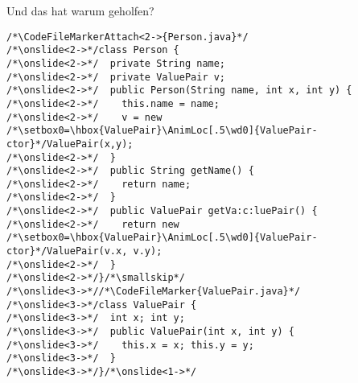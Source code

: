 {\iffull
\begin{frame}[fragile,t]{Und das hat warum geholfen?}
\begin{tikzpicture}[@O]
\end{tikzpicture}\vspace*{-\baselineskip}
\vspace*{-8mm}\columns[t,onlytextwidth]%
\begin{verbatim}
/*\CodeFileMarkerAttach<2->{Person.java}*/
/*\onslide<2->*/class Person {
/*\onslide<2->*/  private String name;
/*\onslide<2->*/  private ValuePair v;
/*\onslide<2->*/  public Person(String name, int x, int y) {
/*\onslide<2->*/    this.name = name;
/*\onslide<2->*/    v = new /*\setbox0=\hbox{ValuePair}\AnimLoc[.5\wd0]{ValuePair-ctor}*/ValuePair(x,y);
/*\onslide<2->*/  }
/*\onslide<2->*/  public String getName() {
/*\onslide<2->*/    return name;
/*\onslide<2->*/  }
/*\onslide<2->*/  public ValuePair getVa:c:luePair() {
/*\onslide<2->*/    return new /*\setbox0=\hbox{ValuePair}\AnimLoc[.5\wd0]{ValuePair-ctor}*/ValuePair(v.x, v.y);
/*\onslide<2->*/  }
/*\onslide<2->*/}/*\smallskip*/
/*\onslide<3->*//*\CodeFileMarker{ValuePair.java}*/
/*\onslide<3->*/class ValuePair {
/*\onslide<3->*/  int x; int y;
/*\onslide<3->*/  public ValuePair(int x, int y) {
/*\onslide<3->*/    this.x = x; this.y = y;
/*\onslide<3->*/  }
/*\onslide<3->*/}/*\onslide<1->*/
\end{verbatim}
\endAnimateCode
{}
\end{frame}}
